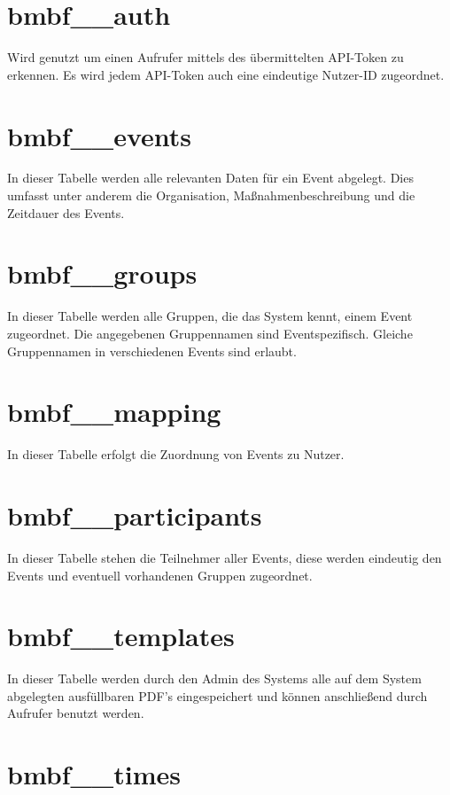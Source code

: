 \documentclass[12pt,parskip=full, pagea4]{scrreprt}
\begin{document}
	
			\section{bmbf\_\_auth}
			
			Wird genutzt um einen Aufrufer mittels des übermittelten API-Token zu erkennen. Es wird jedem API-Token auch eine eindeutige Nutzer-ID zugeordnet.
			
			\section{bmbf\_\_events}
			
			In dieser Tabelle werden alle relevanten Daten für ein Event abgelegt. Dies umfasst unter anderem die Organisation, Maßnahmenbeschreibung und die Zeitdauer des Events.
			
			\section{bmbf\_\_groups}
			
			In dieser Tabelle werden alle Gruppen, die das System kennt, einem Event zugeordnet. Die angegebenen Gruppennamen sind Eventspezifisch. Gleiche Gruppennamen in verschiedenen Events sind erlaubt.
			
			\section{bmbf\_\_mapping}
			
			In dieser Tabelle erfolgt die Zuordnung von Events zu Nutzer.
			
			\section{bmbf\_\_participants}
			
			In dieser Tabelle stehen die Teilnehmer aller Events, diese werden eindeutig den Events und eventuell vorhandenen Gruppen zugeordnet.
			
			\section{bmbf\_\_templates}
			
			In dieser Tabelle werden durch den Admin des Systems alle auf dem System abgelegten ausfüllbaren PDF's eingespeichert und können anschließend durch Aufrufer benutzt werden.
			
			\section{bmbf\_\_times}
			
\end{document}
